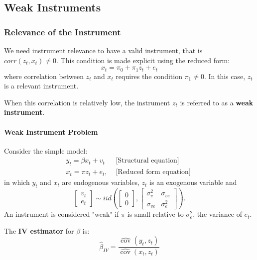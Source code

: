 \documentclass[11pt]{article}
\begin{document}
\subsection{Weak Instruments}

\subsubsection{Relevance of the Instrument}

We need instrument relevance to have a valid instrument, that is $corr(z_t,x_t) \neq0$. This condition is made explicit using the reduced form:
\[x_t = \pi_0 + \pi_1 z_t + e_t\]
where correlation between $z_t$ and $x_t$ requires the condition $\pi_1 \neq0$. In this case, $z_t$ is a relevant instrument.

When this correlation is relatively low, the instrument $z_t$ is referred to as a \textbf{weak instrument}.

\paragraph{Weak Instrument Problem}

Consider the simple model:
\begin{equation}
\begin{array}{ll}
y_t=\beta x_t+v_t & \text { [Structural equation] } \\
x_t=\pi z_t+e_t, & \text { [Reduced form equation] }
\end{array}
\end{equation}
in which $y_t$ and $x_t$ are endogenous variables, $z_t$ is an exogenous variable and
\begin{equation}
\left[\begin{array}{l}
v_t \\
e_t
\end{array}\right] \sim i i d\left(\left[\begin{array}{l}
0 \\
0
\end{array}\right],\left[\begin{array}{cc}
\sigma_v^2 & \sigma_{v e} \\
\sigma_{v e} & \sigma_e^2
\end{array}\right]\right).
\end{equation}
An instrument is considered "weak" if $\pi$ is small relative to $\sigma_e^2$, the variance of $e_t$.

The \textbf{IV estimator} for $\beta$ is:
\begin{equation}
\widehat{\beta}_{I V}=\frac{\widehat{\operatorname{cov}}\left(y_t, z_t\right)}{\widehat{\operatorname{cov}}\left(x_t, z_t\right)}
\end{equation}
\end{document}
